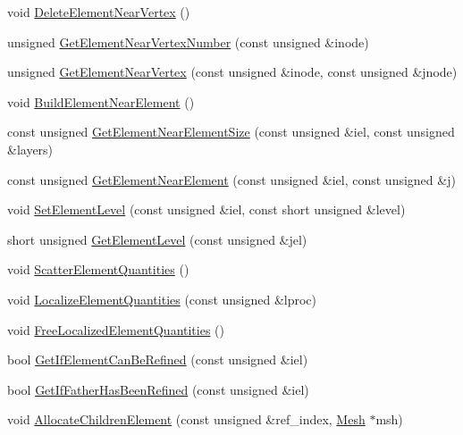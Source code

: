 \begin{DoxyCompactItemize}
\item 
void \mbox{\hyperlink{classfemus_1_1elem_a09e3b298b60d3c830a79eccf6096a5b3}{Delete\+Element\+Near\+Vertex}} ()
\item 
unsigned \mbox{\hyperlink{classfemus_1_1elem_a40bb07b110debe3fb6b0f6fc3586e7f3}{Get\+Element\+Near\+Vertex\+Number}} (const unsigned \&inode)
\item 
unsigned \mbox{\hyperlink{classfemus_1_1elem_a71c390f8dbc0e9fa9fda3810ba059d38}{Get\+Element\+Near\+Vertex}} (const unsigned \&inode, const unsigned \&jnode)
\item 
void \mbox{\hyperlink{classfemus_1_1elem_a70ffdf738d2c80a166fe75394d34b682}{Build\+Element\+Near\+Element}} ()
\item 
const unsigned \mbox{\hyperlink{classfemus_1_1elem_ae8d034134302cca3460a8eacd5867fdf}{Get\+Element\+Near\+Element\+Size}} (const unsigned \&iel, const unsigned \&layers)
\item 
const unsigned \mbox{\hyperlink{classfemus_1_1elem_a55048d0e88b762bc501cce838c297338}{Get\+Element\+Near\+Element}} (const unsigned \&iel, const unsigned \&j)
\item 
void \mbox{\hyperlink{classfemus_1_1elem_afd4939bacbd662d8b95fbc617d5e2d50}{Set\+Element\+Level}} (const unsigned \&iel, const short unsigned \&level)
\item 
short unsigned \mbox{\hyperlink{classfemus_1_1elem_a83d79b7caa55d985d8db0036fc039fbd}{Get\+Element\+Level}} (const unsigned \&jel)
\item 
void \mbox{\hyperlink{classfemus_1_1elem_a0fe3ec99da1be3a261693c929d255dcd}{Scatter\+Element\+Quantities}} ()
\item 
void \mbox{\hyperlink{classfemus_1_1elem_a166e2d2f6c469c38d22a56f265c93484}{Localize\+Element\+Quantities}} (const unsigned \&lproc)
\item 
void \mbox{\hyperlink{classfemus_1_1elem_a04726bccbf84ba133ad7ed1fd03a4dbb}{Free\+Localized\+Element\+Quantities}} ()
\item 
bool \mbox{\hyperlink{classfemus_1_1elem_ad8f5a5bcb03baea3de1e8ca72ab1730d}{Get\+If\+Element\+Can\+Be\+Refined}} (const unsigned \&iel)
\item 
bool \mbox{\hyperlink{classfemus_1_1elem_a11d5f6e51f8de73476bdf9331dfa6e42}{Get\+If\+Father\+Has\+Been\+Refined}} (const unsigned \&iel)
\item 
void \mbox{\hyperlink{classfemus_1_1elem_aac20700f434aedc94f87c6501c8d9e2b}{Allocate\+Children\+Element}} (const unsigned \&ref\+\_\+index, \mbox{\hyperlink{classfemus_1_1_mesh}{Mesh}} $\ast$msh)

\end{DoxyCompactItemize}
